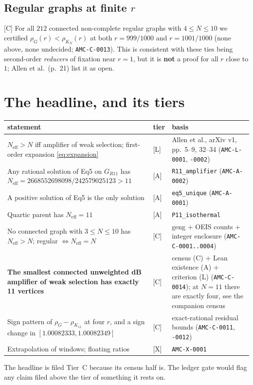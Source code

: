 \documentclass[10pt]{article}
\newcommand{\tier}[1]{\textsf{[#1]}}
\newcommand{\tA}{\tier{A}}
\newcommand{\tL}{\tier{L}}
\newcommand{\tC}{\tier{C}}
\newcommand{\tX}{\tier{X}}
\newcommand{\lean}[1]{\texttt{#1}}
\newcommand{\Neff}{N_{\mathrm{eff}}}
\begin{document}
\subsection{Regular graphs at finite $r$}
\tC{} For all $212$ connected non-complete regular graphs with $4\le N\le10$ we certified $\rho_G(r)<\rho_{K_N}(r)$ at both $r=999/1000$ and $r=1001/1000$ (none above, none undecided; \texttt{AMC-C-0013}). This is consistent with these ties being second-order \emph{reducers} of fixation near $r=1$, but it is
\textbf{not} a proof for all $r$ close to $1$; Allen et al.\ (p.~21) list it as open.

\section{The headline, and its tiers}\label{sec:head}
\begin{center}\small\begin{tabular}{p{7.0cm}p{1.0cm}p{5.2cm}}\toprule
statement & tier & basis\\\midrule
$\Neff>N$ iff amplifier of weak selection; first-order expansion \eqref{eq:expansion} & \tL & Allen et al., arXiv v1, pp.~5--9, 32--34 (\texttt{AMC-L-0001}, \texttt{-0002})\\
Any rational solution of Eq5 on $G_{R11}$ has $\Neff=2668552698098/242579025123>11$ & \tA & \lean{R11\_amplifier} (\texttt{AMC-A-0002})\\
A positive solution of Eq5 is the only solution & \tA & \lean{eq5\_unique} (\texttt{AMC-A-0001})\\
Quartic parent has $\Neff=11$ & \tA & \lean{P11\_isothermal}\\
No connected graph with $3\le N\le10$ has $\Neff>N$; regular $\Leftrightarrow\Neff=N$ & \tC & geng + OEIS counts + integer enclosure (\texttt{AMC-C-0001..0004})\\
\textbf{The smallest connected unweighted dB amplifier of weak selection has exactly 11 vertices} & \tC & census (C) $+$ Lean existence (A) $+$ criterion (L) (\texttt{AMC-C-0014}); at $N=11$ there are exactly four, see the companion census\\
Sign pattern of $\rho_G-\rho_{K_{11}}$ at four $r$, and a sign change in $[1.00082333,1.00082349]$ & \tC & exact-rational residual bounds (\texttt{AMC-C-0011}, \texttt{-0012})\\
Extrapolation of windows; floating ratios & \tX & \texttt{AMC-X-0001}\\\bottomrule
\end{tabular}\end{center}
The headline is filed Tier~C because its census half is. The ledger gate would flag any claim filed above the tier of something it rests on.
\end{document}
